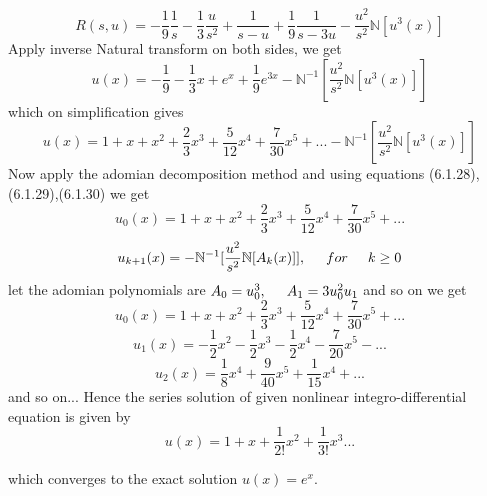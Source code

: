 \begin{equation*}
R(s,u) = -\frac{1}{9}\frac{1}{s} -\frac{1}{3} \frac{u}{s^2} + \frac{1}{s-u} + \frac{1}{9}\frac{1}{s-3u} - \frac{u^2}{s^2}\mathbb{N}[u^3(x)]
\end{equation*}
Apply inverse Natural transform on both sides, we get
\begin{equation*}
u(x) =  - \frac{1}{9} - \frac{1}{3}x + e^{x} + \frac{1}{9}e^{3x} - \mathbb{N}^{-1}[\frac{u^2}{s^2}\mathbb{N}[u^3(x)]]
\end{equation*}
which on simplification gives
\begin{equation*}
u(x) =  1 + x + x^2 + \frac{2}{3}x^3 + \frac{5}{12}x^4 + \frac{7}{30}x^5 + ...- \mathbb{N}^{-1}[\frac{u^2}{s^2}\mathbb{N}[u^3(x)]]
\end{equation*}
Now apply the adomian decomposition method and using equations (6.1.28),(6.1.29),(6.1.30) we get
\begin{equation*}
u_{0}(x) = 1 + x + x^2 + \frac{2}{3}x^3 + \frac{5}{12}x^4 + \frac{7}{30}x^5 + ...
\end{equation*}
\begin{equation*}
   { u_{k+1}(x) = - \mathbb{N}^{-1}[\frac{u^2}{s^2}\mathbb{N}[A_{k}(x)]] , {\hspace{0.5 cm}} for{\hspace{0.5 cm}} k\geq 0}
 \end{equation*}
   let the adomian polynomials are
 $ A_{0} = u_{0}^3  ,{\hspace{0.5 cm}} A_{1} = 3 u_{0}^2u_{1} $  and so on we get
\begin{equation*}
u_{0}(x) = 1 + x + x^2 + \frac{2}{3}x^3 + \frac{5}{12}x^4 + \frac{7}{30}x^5 + ...
\end{equation*}
\begin{equation*}
u_{1}(x) =  - \frac{1}{2}x^2 - \frac{1}{2}x^3 - \frac{1}{2}x^4 - \frac{7}{20}x^5 - ...   
\end{equation*}
\begin{equation*}
u_{2}(x) =  \frac{1}{8}x^4 + \frac{9}{40}x^5 + \frac{1}{15}x^4 + ...    
\end{equation*}
and so on...
Hence the series solution of given nonlinear integro-differential equation  is given by
\begin{equation*}
u(x) = 1 + x + \frac{1}{2!}x^2 + \frac{1}{3!}x^3...
\end{equation*}

which converges to the exact solution  $ u(x) = e^{x}$.
\newpage
{}
